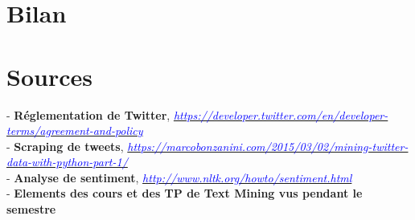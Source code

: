 \documentclass[14pt, openany]{article}
\begin{document}
\section{Bilan}

\section{Sources}
\begin{flushleft}
- \textbf{Réglementation de Twitter}, \href{https://developer.twitter.com/en/developer-terms/agreement-and-policy}{\textit{\textcolor{blue}{https://developer.twitter.com/en/developer-terms/agreement-and-policy}}}\\
\medskip
- \textbf{Scraping de tweets}, \href{https://marcobonzanini.com/2015/03/02/mining-twitter-data-with-python-part-1/}{\textit{\textcolor{blue}{https://marcobonzanini.com/2015/03/02/mining-twitter-data-with-python-part-1/}}}\\
\medskip
- \textbf{Analyse de sentiment}, \href{http://www.nltk.org/howto/sentiment.html}{\textit{\textcolor{blue}{http://www.nltk.org/howto/sentiment.html}}}\\
\medskip
- \textbf{Elements des cours et des TP de Text Mining vus pendant le semestre} 
\end{flushleft}
\end{document}
